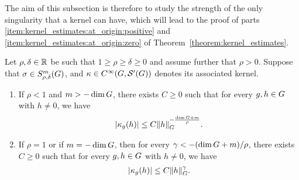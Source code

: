 The aim of this subsection is therefore to study the strength of the only singularity that a kernel can have,
which will lead to the proof of parts \ref{item:kernel_estimates:at_origin:positive} and \ref{item:kernel_estimates:at_origin:zero} of Theorem~\ref{theorem:kernel_estimates}.

\begin{theorem}
\label{theorem:kernel_estimates:at_origin}
    Let $\rho, \delta \in \R$ be such that $1 \geq \rho \geq \delta \geq 0$
    and assume further that $\rho > 0$.
    Suppose that $\sigma \in \SymbolClass{m}{\rho, \delta}$,
    and $\kappa \in \SmoothFunctions {\Group, \TemperedDistributions \Group}$ denotes its associated kernel.
    \begin{enumerate}
        \item
            If $\rho < 1$ and $m > -\dim \Group$, there exists $C \geq 0$ such that for every $g, h \in \Group$ with $h \neq 0$, we have
            \begin{align*}
                \abs{\kappa_g(h)} \leq C \norm [\Group] h^{- \frac{\dim \Group + m}{\rho}}.
            \end{align*}
        \item
            If $\rho = 1$ or if $m = -\dim \Group$,
            then for every $\gamma < -(\dim \Group + m)/\rho$,
            there exists $C \geq 0$ such that for every $g, h \in \Group$ with $h \neq 0$, we have
            \begin{align*}
                \abs{\kappa_g(h)} \leq C \norm [\Group] h^\gamma.
            \end{align*}
    \end{enumerate}
\end{theorem}
